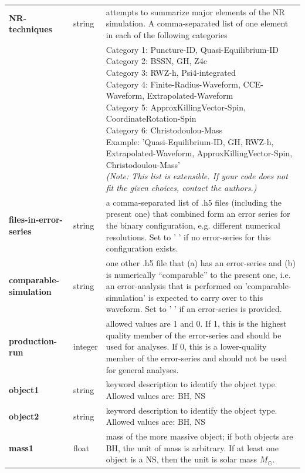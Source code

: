 \documentclass[11pt,tightenlines,article,amssymb,amsmath,amsfonts,superscriptaddress,nofootinbib]{revtex4}
\begin{document}
\begin{longtable}{|p{3.4cm}|p{1.6cm}|p{11.2cm}|}
\textbf{NR-techniques} & string & attempts to summarize major elements of the NR simulation. A comma-separated list of one element in each of the following categories \\
  & & \parbox{11.2cm}{
Category 1: Puncture-ID, Quasi-Equilibrium-ID \\
Category 2: BSSN, GH, Z4c \\
Category 3: RWZ-h,  Psi4-integrated \\
Category 4: Finite-Radius-Waveform, CCE-Waveform, Extrapolated-Waveform \\
Category 5: ApproxKillingVector-Spin, CoordinateRotation-Spin \\
Category 6: Christodoulou-Mass \\
Example: 'Quasi-Equilibrium-ID, GH, RWZ-h, Extrapolated-Waveform, ApproxKillingVector-Spin, Christodoulou-Mass'\\
\emph{(Note: This list is extensible. If your code does not fit the given choices, contact the authors.)}
}\\
\textbf{files-in-error-series} & string &  a comma-separated list of .h5 files (including the present one) that combined form an error series for the binary configuration, e.g. different numerical resolutions. Set to ' ' if no error-series for this configuration exists.\\

\textbf{\footnotesize comparable-simulation} & string & one other .h5 file that (a) has an error-series and (b) is numerically ``comparable'' to the present one, i.e. an error-analysis that is performed on 'comparable-simulation' is expected to carry over to this waveform. Set to ' ' if an error-series is provided.\\

\textbf{production-run} & integer & allowed values are 1 and 0. If 1, this is the highest quality member of the error-series and should be used for analyses.  If 0, this is a lower-quality member of the error-series and should not be used for general analyses.\\

\textbf{object1} & string & keyword description to identify the object type. Allowed values are: BH, NS\\

\textbf{object2} & string & keyword description to identify the object type. Allowed values are: BH, NS\\

\textbf{mass1} & float & mass of the more massive object; if both objects are BH, the unit of mass is arbitrary. If at least one object is a NS, then the unit is solar mass $M_\odot$.\\


\end{longtable}
\end{document}
